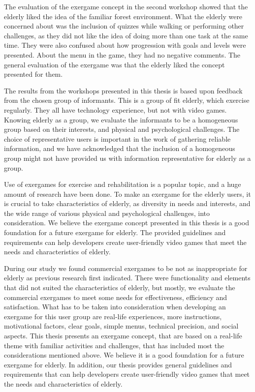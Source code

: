 The evaluation of the exergame concept in the second workshop showed that the elderly liked the idea of the familiar forest environment. What the elderly were concerned about was the inclusion of quizzes while walking or performing other challenges, as they did not like the idea of doing more than one task at the same time. They were also confused about how progression with goals and levels were presented. About the menu in the game, they had no negative comments. The general evaluation of the exergame was that the elderly liked the concept presented for them.  

The results from the workshops presented in this thesis is based upon feedback from the chosen group of informants. This is a group of fit elderly, which exercise regularly. They all have technology experience, but not with video games. Knowing elderly as a group, we evaluate the informants to be a homogeneous group based on their interests, and physical and psychological challenges. The choice of representative users is important in the work of gathering reliable information, and we have acknowledged that the inclusion of a homogeneous group might not have provided us with information representative for elderly as a group.       

Use of exergames for exercise and rehabilitation is a popular topic, and a huge amount of research have been done. To make an exergame for the elderly users, it is crucial to take characteristics of elderly, as diversity in needs and interests, and the wide range of various physical and psychological challenges, into consideration. We believe the exergame concept presented in this thesis is a good foundation for a future exergame for elderly. The provided guidelines and requirements can help developers create user-friendly video games that meet the needs and characteristics of elderly.


During our study we found commercial exergames to be not as inappropriate for elderly as previous research first indicated. There were functionality and elements that did not suited the characteristics of elderly, but mostly, we evaluate the commercial exergames to meet some needs for effectiveness, efficiency and satisfaction.  What has to be taken into consideration when developing an exergame for this user group are real-life experiences, more instructions, motivational factors, clear goals, simple menus, technical precision, and social aspects. This thesis presents an exergame concept, that are based on a real-life theme with familiar activities and challenges, that has included most the considerations mentioned above. We believe it is a good foundation for a future exergame for elderly. In addition, our thesis provides general guidelines and requirements that can help developers create user-friendly video games that meet the needs and characteristics of elderly.  

